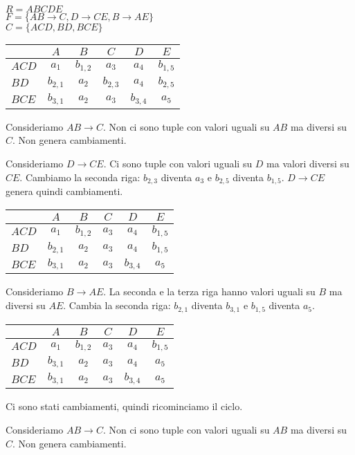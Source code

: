 \begin{exmp}
$R = ABCDE$ \\
$F = \{ AB \to C, D \to CE, B \to AE \}$ \\
$C = \{ ACD, BD, BCE \}$

\begin{tabular}{l | *{5}{c}}
 & $A$ & $B$ & $C$ & $D$ & $E$ \\
\hline
$ACD$ & $a_1$ & $b_{1,2}$ & $a_3$ & $a_4$ & $b_{1,5}$ \\
$BD$ & $b_{2,1}$ & $a_2$ & $b_{2,3}$ & $a_4$ & $b_{2,5}$ \\
$BCE$ & $b_{3,1}$ & $a_2$ & $a_3$ & $b_{3,4}$ & $a_5$
\end{tabular}

Consideriamo $AB \to C$. Non ci sono tuple con valori uguali su $AB$ ma diversi su $C$. Non genera cambiamenti.

Consideriamo $D \to CE$. Ci sono tuple con valori uguali su $D$ ma valori diversi su $CE$. Cambiamo la seconda riga: $b_{2,3}$ diventa $a_3$ e $b_{2,5}$ diventa $b_{1,5}$. $D \to CE$ genera quindi cambiamenti.

\begin{tabular}{l | *{5}{c}}
 & $A$ & $B$ & $C$ & $D$ & $E$ \\
\hline
$ACD$ & $a_1$ & $b_{1,2}$ & $a_3$ & $a_4$ & $b_{1,5}$ \\
$BD$ & $b_{2,1}$ & $a_2$ & \cellcolor{green!20} $a_3$ & $a_4$ & \cellcolor{green!20} $b_{1,5}$ \\
$BCE$ & $b_{3,1}$ & $a_2$ & $a_3$ & $b_{3,4}$ & $a_5$
\end{tabular}

Consideriamo $B \to AE$. La seconda e la terza riga hanno valori uguali su $B$ ma diversi su $AE$. Cambia la seconda riga: $b_{2,1}$ diventa $b_{3,1}$ e $b_{1,5}$ diventa $a_5$.

\begin{tabular}{l | *{5}{c}}
 & $A$ & $B$ & $C$ & $D$ & $E$ \\
\hline
$ACD$ & $a_1$ & $b_{1,2}$ & $a_3$ & $a_4$ & $b_{1,5}$ \\
$BD$ & \cellcolor{green!20} $b_{3,1}$ & $a_2$ & $a_3$ & $a_4$ & \cellcolor{green!20} $a_5$ \\
$BCE$ & $b_{3,1}$ & $a_2$ & $a_3$ & $b_{3,4}$ & $a_5$
\end{tabular}

Ci sono stati cambiamenti, quindi ricominciamo il ciclo.

Consideriamo $AB \to C$. Non ci sono tuple con valori uguali su $AB$ ma diversi su $C$. Non genera cambiamenti.


\end{exmp}

